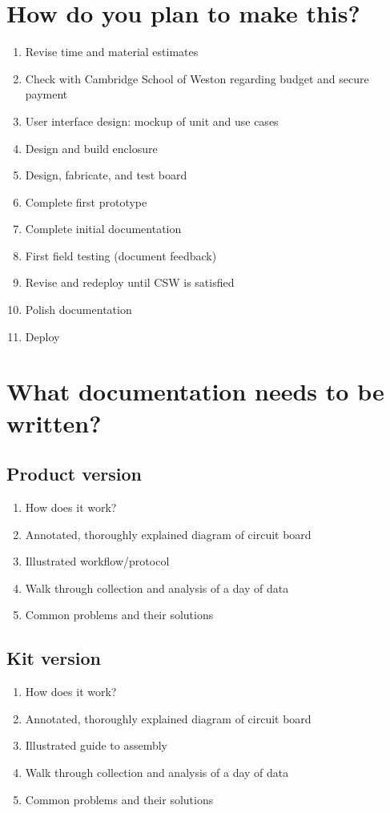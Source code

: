 \documentclass[11pt]{article}
\begin{document}
\section{How do you plan to make this?}
\begin{enumerate}
\item Revise time and material estimates
\item Check with Cambridge School of Weston regarding budget and secure payment
\item User interface design: mockup of unit and use cases
\item Design and build enclosure
\item Design, fabricate, and test board
\item Complete first prototype
\item Complete initial documentation
\item First field testing (document feedback)
\item Revise and redeploy until CSW is satisfied
\item Polish documentation
\item Deploy
\end{enumerate}


\section{What documentation needs to be written?}
\subsection{Product version}
\begin{enumerate}
\item How does it work?
\item Annotated, thoroughly explained diagram of circuit board
\item Illustrated workflow/protocol
\item Walk through collection and analysis of a day of data
\item Common problems and their solutions
\end{enumerate}

\subsection{Kit version}
\begin{enumerate}
\item How does it work?
\item Annotated, thoroughly explained diagram of circuit board
\item Illustrated guide to assembly
\item Walk through collection and analysis of a day of data
\item Common problems and their solutions
\end{enumerate}
\end{document}
